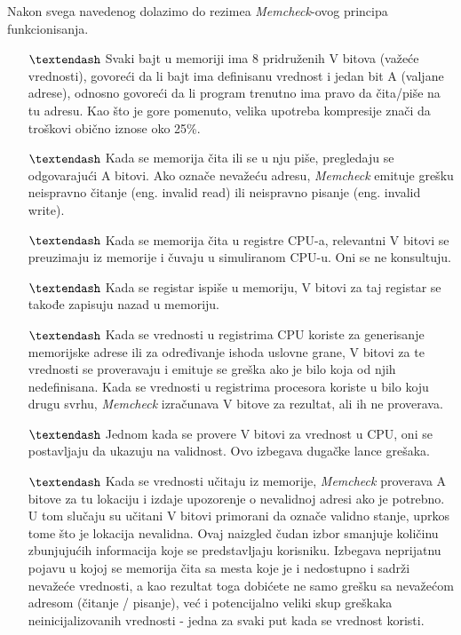 \documentclass[12pt,oneside]{memoir}
\theoremstyle{plain}
\theoremstyle{definition}
\begin{document}
Nakon svega navedenog dolazimo do rezimea \textit{Memcheck}-ovog principa funkcionisanja.
\begin{itemize}
\item[$\textendash$] Svaki bajt u memoriji ima 8 pridruženih V bitova (važeće vrednosti), govoreći da li bajt ima definisanu vrednost i jedan bit A (valjane adrese), odnosno govoreći da li program trenutno ima pravo da čita/piše na tu adresu. Kao što je gore pomenuto, velika upotreba kompresije znači da troškovi obično iznose oko 25\%.
\item[$\textendash$] Kada se memorija čita ili se u nju piše, pregledaju se odgovarajući A bitovi. Ako označe nevažeću adresu, \textit{Memcheck} emituje grešku neispravno čitanje (eng. invalid read) ili neispravno pisanje (eng. invalid write).
\item[$\textendash$] Kada se memorija čita u registre CPU-a, relevantni V bitovi se preuzimaju iz memorije i čuvaju u simuliranom CPU-u. Oni se ne konsultuju.
\item[$\textendash$] Kada se registar ispiše u memoriju, V bitovi za taj registar se takođe zapisuju nazad u memoriju.
\item[$\textendash$] Kada se vrednosti u registrima CPU koriste za generisanje memorijske adrese ili za određivanje ishoda uslovne grane, V bitovi za te vrednosti se proveravaju i emituje se greška ako je bilo koja od njih nedefinisana. Kada se vrednosti u registrima procesora koriste u bilo koju drugu svrhu, \textit{Memcheck} izračunava V bitove za rezultat, ali ih ne proverava.
\item[$\textendash$] Jednom kada se provere V bitovi za vrednost u CPU, oni se postavljaju da ukazuju na validnost. Ovo izbegava dugačke lance grešaka.
\item[$\textendash$] Kada se vrednosti učitaju iz memorije, \textit{Memcheck} proverava A bitove za tu lokaciju i izdaje upozorenje o nevalidnoj adresi ako je potrebno. U tom slučaju su učitani V bitovi primorani da označe validno stanje, uprkos tome što je lokacija nevalidna. Ovaj naizgled čudan izbor smanjuje količinu zbunjujućih informacija koje se predstavljaju korisniku. Izbegava neprijatnu pojavu u kojoj se memorija čita sa mesta koje je i nedostupno i sadrži nevažeće vrednosti, a kao rezultat toga dobićete ne samo grešku sa nevažećom adresom (čitanje / pisanje), već i potencijalno veliki skup greškaka neinicijalizovanih vrednosti - jedna za svaki put kada se vrednost koristi.
\end{itemize}
\end{document}
